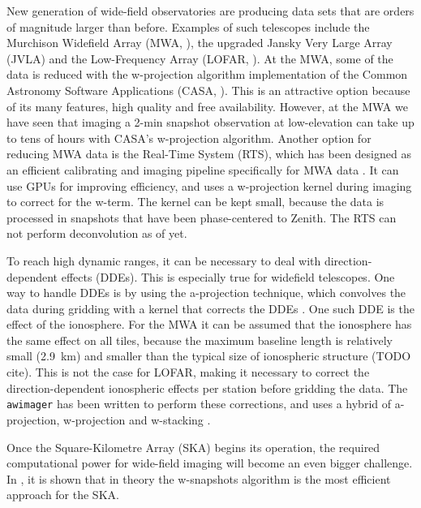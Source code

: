 \documentclass[useAMS,usenatbib]{mn2e}
\begin{document}
New generation of wide-field observatories are producing data sets that are orders of magnitude larger than before. Examples of such telescopes include the Murchison Widefield Array (MWA, \citealt{mwa}), the upgraded Jansky Very Large Array (JVLA) and the Low-Frequency Array (LOFAR, \citealt{lofar-2013}). At the MWA, some of the data is reduced with the w-projection algorithm implementation of the Common Astronomy Software Applications (CASA, \citealt{casa}). This is an attractive option because of its many features, high quality and free availability. However, at the MWA we have seen that imaging a 2-min snapshot observation at low-elevation can take up to tens of hours with CASA's w-projection algorithm. Another option for reducing MWA data is the Real-Time System (RTS), which has been designed as an efficient calibrating and imaging pipeline specifically for MWA data \citep{rts-mwa}. It can use GPUs for improving efficiency, and uses a w-projection kernel during imaging to correct for the w-term. The kernel can be kept small, because the data is processed in snapshots that have been phase-centered to Zenith. The RTS can not perform deconvolution as of yet.

To reach high dynamic ranges, it can be necessary to deal with direction-dependent effects (DDEs). This is especially true for widefield telescopes. One way to handle DDEs is by using the a-projection technique, which convolves the data during gridding with a kernel that corrects the DDEs \citep{aprojection-2008}.
One such DDE is the effect of the ionosphere. For the MWA it can be assumed that the ionosphere has the same effect on all tiles, because the maximum baseline length is relatively small (2.9~km) and smaller than the typical size of ionospheric structure (TODO cite). This is not the case for LOFAR, making it necessary to correct the direction-dependent ionospheric effects per station before gridding the data. The \texttt{awimager} has been written to perform these corrections, and uses a hybrid of a-projection, w-projection and w-stacking \citep{awimager-2013}.

Once the Square-Kilometre Array (SKA) begins its operation, the required computational power for wide-field imaging will become an even bigger challenge. In \citet{widefield-imaging-ska-cornwell}, it is shown that in theory the w-snapshots algorithm is the most efficient approach for the SKA.
\end{document}
